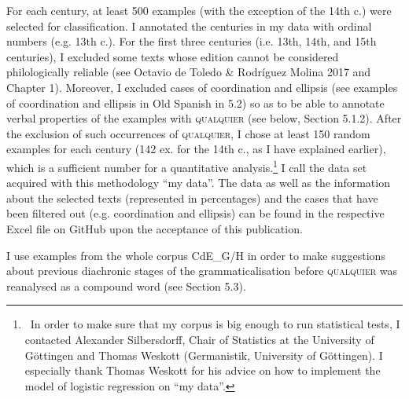 \documentclass[10pt]{article}
\newenvironment{styleStandard}{\renewcommand\baselinestretch{1.25}\setlength\leftskip{0cm}\setlength\rightskip{0cm}\setlength\parindent{0cm}\setlength\parfillskip{0pt plus 1fil}\setlength\parskip{0in plus 1pt}\writerlistparindent\writerlistleftskip\leavevmode\normalfont\normalsize\fontsize{12pt}{14.4pt}\selectfont\writerlistlabel\ignorespaces}{\unskip\vspace{0in plus 1pt}\par}
\newcommand\writerlistleftskip{}
\newcommand\writerlistparindent{}
\newcommand\writerlistlabel{}
\begin{document}
\begin{styleStandard}
For each century, at least 500 examples (with the exception of the 14th c.) were selected for classification. I annotated the centuries in my data with ordinal numbers (e.g. 13th c.). For the first three centuries (i.e. 13th, 14th, and 15th centuries), I excluded some texts whose edition cannot be considered philologically reliable (see Octavio de Toledo \& Rodríguez Molina 2017 and Chapter 1). Moreover, I excluded cases of coordination and ellipsis (see examples of coordination and ellipsis in Old Spanish in 5.2) so as to be able to annotate verbal properties of the examples with \textsc{qualquier} (see below, Section 5.1.2). After the exclusion of such occurrences of \textsc{qualquier}, I chose at least 150 random examples for each century (142 ex. for the 14th c., as I have explained earlier), which is a sufficient number for a quantitative analysis.\footnote{\ \textrm{In order to make sure that my corpus is big enough to run statistical tests, I contacted} \textrm{Alexander Silbersdorff, Chair of Statistics at the University of Göttingen and Thomas Weskott (Germanistik, University of Göttingen). I especially thank Thomas Weskott for his advice on how to implement the model of logistic regression on “my data”.}} I call the data set acquired with this methodology “my data”. The data as well as the information about the selected texts (represented in percentages) and the cases that have been filtered out (e.g. coordination and ellipsis) can be found in the respective Excel file on GitHub upon the acceptance of this publication.
\end{styleStandard}

\begin{styleStandard}
I use examples from the whole corpus CdE\_G/H in order to make suggestions about previous diachronic stages of the grammaticalisation before \textsc{qualquier} was reanalysed as a compound word (see Section 5.3). 
\end{styleStandard}
\end{document}
